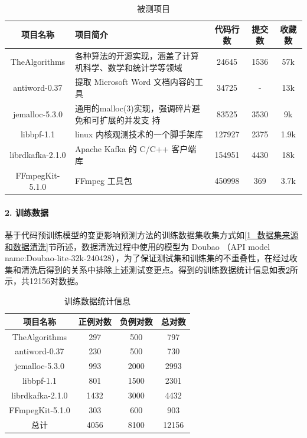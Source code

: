 \begin{table}[htbp]
\caption{被测项目}
\label{1_data_from}
\vspace{0.5em}\centering\wuhao
\begin{tabular}{cp{6cm}ccc}
\toprule
项目名称 & 项目简介 & 代码行数& 提交数 & 收藏数 \\
\midrule
TheAlgorithms & 各种算法的开源实现，涵盖了计算机科学、数学和统计学等领域 & 24645 & 1536 & 57k \\
antiword-0.37 & 提取 Microsoft Word 文档内容的工具 & 34725& - & 13k\\
jemalloc-5.3.0 & 通用的malloc(3)实现，强调碎片避免和可扩展的并发支
持  &83525& 3530 & 9k \\
libbpf-1.1 & linux 内核观测技术的一个脚手架库 & 127927 & 2375 & 1.9k \\
librdkafka-2.1.0& Apache Kafka 的 C/C++ 客户端库 & 154951 & 4430 & 18k \\
FFmpegKit-5.1.0 & FFmpeg 工具包 & 450998 & 369 & 3.7k \\

\bottomrule
\end{tabular}
\end{table}


\paragraph{2. 训练数据}
基于代码预训练模型的变更影响预测方法的训练数据集收集方式如\ref{1_数据集来源和数据清洗}节所述，数据清洗过程中使用的模型为 Doubao （API model name:Doubao-lite-32k-240428），为了保证测试集和训练集的不重叠性，在经过收集和清洗后得到的关系中排除上述测试变更点。得到的训练数据统计信息如表\ref{1_数据集统计信息}所示，共12156对数据。

\begin{table}[htbp]
\caption{训练数据统计信息}
\label{1_数据集统计信息}
\vspace{0.5em}\centering\wuhao
\begin{tabular}{cccc}
\toprule
项目名称 & 正例对数 & 负例对数 & 总对数 \\
\midrule
TheAlgorithms    & 297 & 500 & 797 \\
antiword-0.37    & 230 & 500  & 730 \\
jemalloc-5.3.0   & 993 & 2000 & 2993 \\
libbpf-1.1       & 801 & 1500 & 2301 \\
librdkafka-2.1.0 & 1432  & 3000 & 4432 \\
FFmpegKit-5.1.0  & 303 & 600 & 903 \\ 
总计              & 4056 & 8100 & 12156 \\
\bottomrule
\end{tabular}
\end{table}


